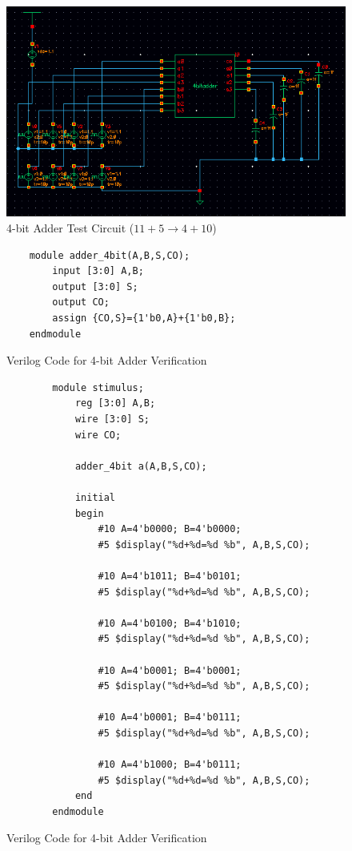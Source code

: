 \documentclass[12pt]{article}
\begin{document}
\begin{figure}[H]
\centering
\includegraphics[width=1\linewidth]{test_circuit}
\caption{4-bit Adder Test Circuit ($11+5 \to 4+10$)}
\label{fig:test_circuit}
\end{figure}

\begin{figure}[H]
	\begin{lstlisting}
	module adder_4bit(A,B,S,CO);
		input [3:0] A,B;
		output [3:0] S;
		output CO;
		assign {CO,S}={1'b0,A}+{1'b0,B};
	endmodule
\end{lstlisting}
\caption{Verilog Code for 4-bit Adder Verification}
\label{fig:verilog}
\end{figure}

\begin{figure}[H]
	\begin{lstlisting}
		module stimulus;
			reg [3:0] A,B;
			wire [3:0] S;
			wire CO;
		
			adder_4bit a(A,B,S,CO);
		
			initial
			begin
				#10 A=4'b0000; B=4'b0000;
				#5 $display("%d+%d=%d %b", A,B,S,CO);
		
				#10 A=4'b1011; B=4'b0101;
				#5 $display("%d+%d=%d %b", A,B,S,CO);
		
				#10 A=4'b0100; B=4'b1010;
				#5 $display("%d+%d=%d %b", A,B,S,CO);
		
				#10 A=4'b0001; B=4'b0001;
				#5 $display("%d+%d=%d %b", A,B,S,CO);
		
				#10 A=4'b0001; B=4'b0111;
				#5 $display("%d+%d=%d %b", A,B,S,CO);
		
				#10 A=4'b1000; B=4'b0111;
				#5 $display("%d+%d=%d %b", A,B,S,CO);
			end
		endmodule
	\end{lstlisting}
	\caption{Verilog Code for 4-bit Adder Verification}
	\label{fig:verilog_stim}
\end{figure}
\end{document}
